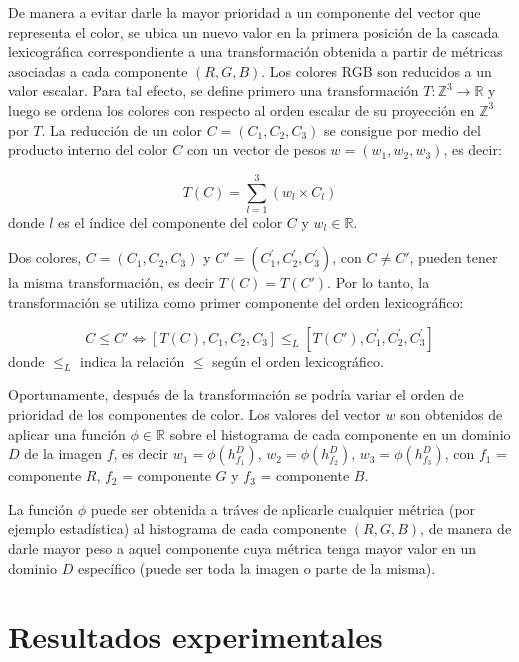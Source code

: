De manera a evitar darle la mayor prioridad a un componente del vector que representa el color, se ubica un nuevo valor en la primera posici\'on de la cascada lexicogr\'afica correspondiente a una transformaci\'on obtenida a partir de m\'etricas asociadas a cada componente $(R,G,B)$.
Los colores RGB son reducidos a un valor escalar. Para tal efecto, se define primero una transformaci\'on $T:\mathbb{Z}^3 \rightarrow \mathbb{R}$ y luego se ordena los colores con respecto al orden escalar de su proyecci\'on en $\mathbb{Z}^3$ por $T$.
La reducci\'on de un color $
C=(C_1,C_2,C_3)$ se consigue por medio del producto interno del color $C$ con un vector de pesos $w=(w_1,w_2,w_3) $, es decir:

\begin{equation}
\label{Transformacion}
T(C)= \sum_{l=1}^3(w_l \times C_l)
\end{equation}  
donde $l$ es el \'indice del componente del color $C$ y $w_l \in \mathbb{R}$. 

Dos colores, $C=(C_1,C_2,C_3)$ y $C'=(C_1^{'},C_2^{'},C_3^{'})$, con $C\neq C'$, pueden tener la misma transformaci\'on, es decir $T(C) = T(C')$.  Por lo tanto, la transformaci\'on se utiliza como primer componente del orden lexicogr\'afico:

\begin{equation}
\label{Mio} 
 C\leq C'\Leftrightarrow [T(C),C_1,C_2,C_3] \leq_L [T(C'),C_1^{'},C_2^{'},C_3^{'}]
\end{equation} donde $\leq_L$ indica la relación $\leq$ según el orden lexicográfico.	

Oportunamente, despu\'es de la transformaci\'on se podr\'ia variar el orden de prioridad de los componentes de color.
Los valores del vector $w$ son obtenidos de aplicar una funci\'on $\phi \in \mathbb{R}$ sobre el histograma de cada componente en un dominio $D$ de la imagen $f$, es decir $w_1 = \phi(h_{f_1}^D)$, $w_2 = \phi(h_{f_2}^D)$, $w_3 = \phi(h_{f_3}^D)$, con $f_1$ = componente $R$, $f_2$ = componente $G$ y $f_3$ =  componente $B$.

La funci\'on $\phi$ puede ser obtenida a tr\'aves de aplicarle cualquier m\'etrica (por ejemplo estad\'istica) al histograma de cada componente  $(R,G,B)$, de manera de darle mayor peso a aquel componente cuya m\'etrica tenga mayor valor en un dominio $D$ espec\'ifico (puede ser toda la imagen o parte de la misma). 

 \section{Resultados experimentales}

